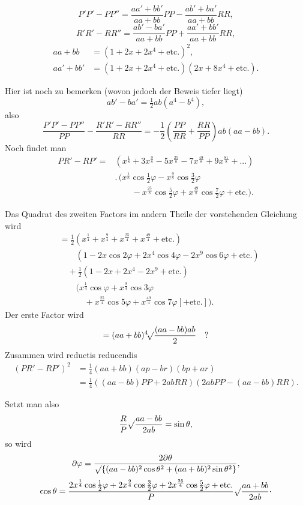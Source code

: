 \[
P'P'-PP''=\frac{aa'+bb'}{aa+bb}PP-\frac{ab'+ba'}{aa+bb}RR,
\]
\[
R'R'-RR''=\frac{ab'-ba'}{aa+bb}PP+\frac{aa'+bb'}{aa+bb}RR,
\]
\[\begin{aligned}
aa+bb&=(1+2x+2x^4+\text{etc.})^2,\\
aa'+bb'&=(1+2x+2x^4+\text{etc.})(2x+8x^4+\text{etc.}).
\end{aligned}\]
\clearpage{}
\par\indent Hier ist noch zu bemerken (wovon jedoch der Beweis tiefer liegt)
\[ab'-ba'=\tfrac12ab(a^4-b^4),\]
\noindent also
\[
\frac{P'P'-PP''}{PP}-\frac{R'R'-RR''}{RR}=-\frac12\left(\frac{PP}{RR}+\frac{RR}{PP}\right)ab(aa-bb).
\]
\noindent Noch findet man
\[\begin{aligned}
PR'-RP'={}&(x^{\frac18}+3x^{\frac98}-5x^{\frac{25}8}-7x^{\frac{49}8}+9x^{\frac{81}8}+{.}{.}{.})\\
&.\,(x^{\frac18}\cos\tfrac12\varphi-x^{\frac98}\cos\tfrac32\varphi\\
&\qquad-x^{\frac{25}8}\cos\tfrac52\varphi+x^{\frac{49}8}\cos\tfrac72\varphi+\text{etc.}).
\end{aligned}\]
\par\indent Das Quadrat des zweiten Factors im andern Theile der vorstehenden Gleichung wird
\[\begin{aligned}
&=\tfrac12(x^{\frac14}+x^{\frac94}+x^{\frac{25}4}+x^{\frac{49}4}+\text{etc.})\\
&\qquad(1-2x\cos2\varphi+2x^4\cos4\varphi-2x^9\cos6\varphi+\text{etc.})\\
&\quad+\tfrac12(1-2x+2x^4-2x^9+\text{etc.})\\
&\qquad(x^{\frac14}\cos\varphi+x^{\frac94}\cos3\varphi\\
&\qquad\quad+x^{\frac{25}4}\cos5\varphi+x^{\frac{49}4}\cos7\varphi[+\text{etc.}]).
\end{aligned}\]
\noindent Der erste Factor wird
\[=(aa+bb){}^{4}\!\surd\frac{(aa-bb)ab}{2}\quad?\]
\noindent Zusammen wird reductis reducendis
\[\begin{aligned}
(PR'-RP')^2&=\tfrac14(aa+bb)(ap-br)(bp+ar)\\
&=\tfrac14((aa-bb)PP+2abRR)(2abPP-(aa-bb)RR).
\end{aligned}\]
\par\indent Setzt man also
\[\frac RP\surd\frac{aa-bb}{2ab}=\sin\theta,\]
\noindent so wird
\[
\partial\varphi=\frac{2\partial\theta}{\surd\{(aa-bb)^2\cos\theta^2+(aa+bb)^2\sin\theta^2\}},
\]
\[
\cos\theta=\frac{2x^{\frac14}\cos\tfrac12\varphi+2x^{\frac94}\cos\tfrac32\varphi+2x^{\frac{25}4}\cos\tfrac52\varphi+\text{etc.}}{P}\surd\frac{aa+bb}{2ab}\mathpunct{\raisebox{.5ex}{.}}
\]
\ClosingRule
\clearpage
\endgroup
